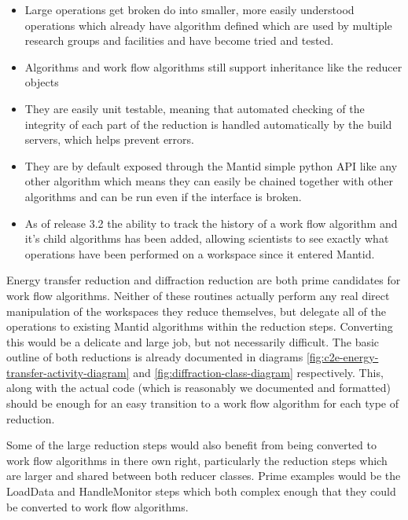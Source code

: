 \documentclass[paper=a4, fontsize=11pt]{scrartcl}	%
\numberwithin{equation}{section}															%
\numberwithin{figure}{section}																%
\numberwithin{table}{section}																%
\begin{document}
\begin{itemize}
\item Large operations get broken do into smaller, more easily understood operations which already have algorithm defined which are used by multiple research groups and facilities and have become tried and tested.

\item Algorithms and work flow algorithms still support inheritance like the reducer objects

\item They are easily unit testable, meaning that automated checking of the integrity of each part of the reduction is handled automatically by the build servers, which helps prevent errors.

\item They are by default exposed through the Mantid simple python API like any other algorithm which means they can easily be chained together with other algorithms and can be run even if the interface is broken.

\item As of release 3.2 the ability to track the history of a work flow algorithm and it's child algorithms has been added, allowing scientists to see exactly what operations have been performed on a workspace since it entered Mantid.
\end{itemize}

Energy transfer reduction and diffraction reduction are both prime candidates for work flow algorithms. Neither of these routines actually perform any real direct manipulation of the workspaces they reduce themselves, but delegate all of the operations to existing Mantid algorithms within the reduction steps. Converting this would be a delicate and large job, but not necessarily difficult. The basic outline of both reductions is already documented in diagrams \ref{fig:c2e-energy-transfer-activity-diagram} and \ref{fig:diffraction-class-diagram} respectively. This, along with the actual code (which is reasonably we documented and formatted) should be enough for an easy transition to a work flow algorithm for each type of reduction.

Some of the large reduction steps would also benefit from being converted to work flow algorithms in there own right, particularly the reduction steps which are larger and shared between both reducer classes. Prime examples would be the LoadData and HandleMonitor steps which both complex enough that they could be converted to work flow algorithms.
\end{document}
